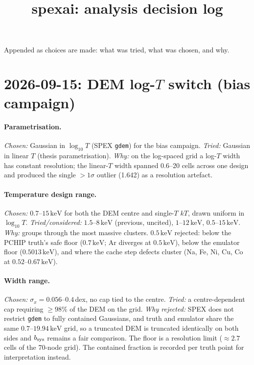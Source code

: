 \documentclass[11pt]{article}
\title{spexai: analysis decision log}
\date{}
\newcommand{\kev}{\,\mathrm{keV}}
\begin{document}
\maketitle

Appended as choices are made: what was tried, what was chosen, and why.

\section*{2026-09-15: DEM log-$T$ switch (bias campaign)}

\paragraph{Parametrisation.} \emph{Chosen:} Gaussian in $\log_{10}T$
(SPEX \texttt{gdem}) for the bias campaign. \emph{Tried:} Gaussian in linear
$T$ (thesis parametrisation). \emph{Why:} on the log-spaced grid a log-$T$
width has constant resolution; the linear-$T$ width spanned 0.6--20 cells across
one design and produced the single $>1\sigma$ outlier (1.642) as a resolution
artefact.

\paragraph{Temperature design range.} \emph{Chosen:} $0.7$--$15\kev$ for both
the DEM centre and single-$T$ $kT$, drawn uniform in $\log_{10}T$.
\emph{Tried/considered:} $1.5$--$8\kev$ (previous, uncited), $1$--$12\kev$,
$0.5$--$15\kev$. \emph{Why:} groups through the most massive clusters.
$0.5\kev$ rejected: below the PCHIP truth's safe floor ($0.7\kev$; Ar diverges
at $0.5\kev$), below the emulator floor ($0.5013\kev$), and where the cache step
defects cluster (Na, Fe, Ni, Cu, Co at $0.52$--$0.67\kev$).

\paragraph{Width range.} \emph{Chosen:} $\sigma_x = 0.056$--$0.4$\,dex, no cap
tied to the centre. \emph{Tried:} a centre-dependent cap requiring $\ge98\%$ of
the DEM on the grid. \emph{Why rejected:} SPEX does not restrict \texttt{gdem}
to fully contained Gaussians, and truth and emulator share the same
$0.7$--$19.94\kev$ grid, so a truncated DEM is truncated identically on both
sides and $b_{\rm sys}$ remains a fair comparison. The floor is a resolution
limit ($\approx2.7$ cells of the 70-node grid). The contained fraction is
recorded per truth point for interpretation instead.
\end{document}
